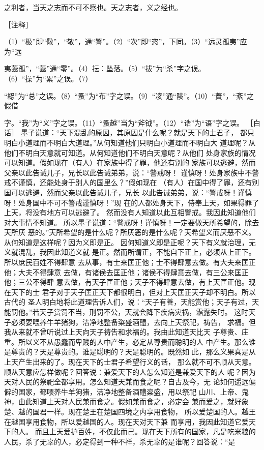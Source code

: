 \documentclass[12pt,UTF8]{ctexbook}
\begin{document}
之利者，当天之志而不可不察也。天之志者，义之经也。 


［注释］ 

（1）“极”即“儆”，“敬”，通“警”。（2）“次”即“恣”，下同。（3）“远灵孤夷”应为“远 

夷蘦孤”，“蘦”通“零”。（4）抎：坠落。（5）“拔”为“杀”字之误。（6）“操”为“累”之误。（7） 

“綛”为“总”之误。（8）“蚤”为“布”字之误。（9）“凌”通“陵”。（10）“蕡”，“紊”之假借 

字。“我”为“义”字之误。（11）“蚤越”当为“斧钺”。（12）“诰”为“语”字之误。 
［白话］ 
墨子说道：“天下混乱的原因，其原因是什么呢？就是天下的士君子， 
都只明白小道理而不明白大道理。”从何知道他们只明白小道理而不明白大 
道理呢？从他们不明白天意就可知道。从何知道他们不明白天意呢？从他们 
处身家族的情况可以知道。假如现在（有人）在家族中得了罪，他还有别的 
家族可以逃避，然而父亲以此告诫儿子，兄长以此告诫弟弟，说：“警戒呀！ 
谨慎呀！处身家族中不警戒不谨慎，还能处身于别人的国里么？”假如现在 
（有人）在国中得了罪，还有别国可以逃避，然而父亲以此告诫儿子，兄长 
以此告诫弟弟，说：“警戒呀！谨慎呀！处身国中不可不警戒谨慎呀！”现 
在的人都处身天下，侍奉上天，如果得罪了上天，将没有地方可以逃避了。 
然而没有人知道以此互相警戒。我因此知道他们对大事情不知道。 
所以墨子说道：“警戒呀！谨慎呀！一定要做天所希望的，除去天所厌 
恶的。”天所希望的是什么呢？所厌恶的是什么呢？天希望义而厌恶不义。 
从何知道是这样呢？因为义即是正。 
因何知道义即是正呢？天下有义就治理，无义就混乱，我因此知道义就 
是正。然而所谓正，不能自下正上，必须从上正下。所以庶民百姓不得肆意 
去从事，有士来匡正他；士不得肆意去做。有大夫来匡正他；大夫不得肆意 
去做，有诸侯去匡正他；诸侯不得肆意去做，有三公来匡正他；三公不得肆 
意去做，有天子匡正他；天子不得肆意去做，有上天匡正他。现在天下的士 
君子对于天子匡正天下都很明白，但对上天匡正天子却不明白。所以古代的 
圣人明白地将此道理告诉人们，说：“天子有善，天能赏他；天子有过，天 
能罚他。”若天子赏罚不当，刑罚不公，天就会降下疾病灾祸，霜露失时。 
这时天子必须要喂养牛羊猪狗，洁净地整备粢盛酒醴，去向上天祭祀，祷告， 
求福。但我从来就不曾听说过上天向天子祷告和求福的。我由此知道天比天 
子尊贵、庄重。所以义不从愚蠢而卑贱的人中产生，必定从尊贵而聪明的人 
中产生。那么谁是尊贵的？天是尊贵的。谁是聪明的？天是聪明的。既然如 
此，那么义果真是从上天产生出来的了。现在天下的士君子希望行义的话， 
那么就不可不顺从天意。 
顺从天意应怎样做呢？回答说：兼爱天下的人怎么知道是兼爱天下的人 
呢？因为天对人民的祭祀全都享用。怎么知道天兼而食之呢？自古及今，无 
论如何遥远偏僻的国家，都喂养牛羊狗猪，洁净地整备酒醴粢盛，用以祭祀 
山川、上帝、鬼神，由此知道上天对人民兼而食之。假如兼而食之，必定会 
兼而爱之，就好象楚、越的国君一样。现在楚王在楚国四境之内享用食物， 
所以爱楚国的人。越王在越国享用食物，所以爱越国的人。现在天对天下兼 
而享用，我因此知道它爱天下的人。 
而且上天爱护百姓，不仅此而己。现在天下所有的国家，凡是吃米粮的 
人民，杀了无辜的人，必定得到一种不祥，杀无辜的是谁呢？回答说：“是 
\end{document}
